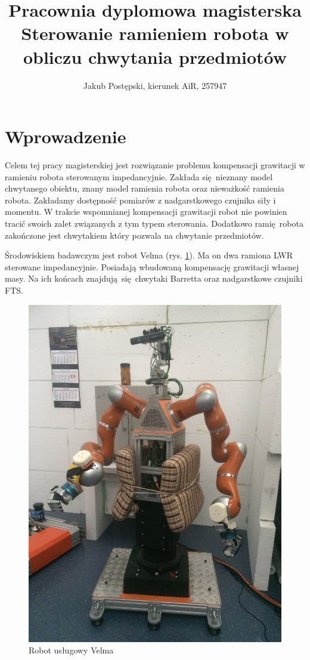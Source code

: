 \documentclass[12pt,a4paper]{article}
\begin{document}
	\title{Pracownia dyplomowa magisterska \\ Sterowanie ramieniem robota w obliczu chwytania przedmiotów}
	\author{Jakub Postępski, kierunek AiR, 257947}
	\maketitle
	
	\tableofcontents
	
	
	\section{Wprowadzenie}
	Celem tej pracy magisterskiej jest rozwiązanie problemu kompensacji grawitacji w ramieniu robota sterowanym impedancyjnie. Zakłada się nieznany model chwytanego obiektu, znany model ramienia robota oraz nieważkość ramienia robota. Zakładamy dostępność pomiarów z nadgarstkowego czujnika siły i momentu. W trakcie wspomnianej kompensacji grawitacji robot nie powinien tracić swoich zalet związanych z tym typem sterowania. Dodatkowo ramię robota zakończone jest chwytakiem który pozwala na chwytanie przedmiotów.
	
	Środowiskiem badawczym jest robot Velma\cite{velma} (rys. \ref{fig:velma}). Ma on dwa ramiona LWR\cite{lwr} sterowane impedancyjnie. Posiadają wbudowaną kompensację grawitacji własnej masy. Na ich końcach znajdują się chwytaki Barretta oraz nadgarstkowe czujniki FTS.
	
	\begin{figure}[H]
		\centering
		\includegraphics[scale=0.05, angle =-90]{velma}
		\caption{Robot usługowy Velma}
		\label{fig:velma}
	\end{figure}
	
\end{document}
